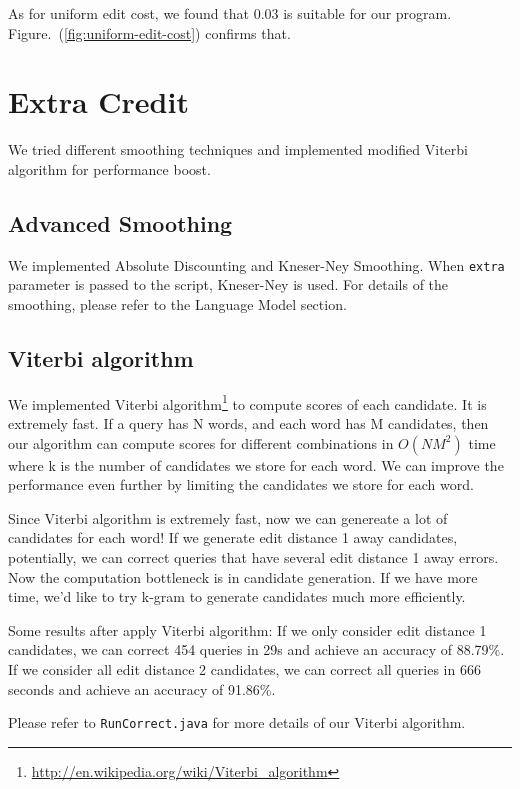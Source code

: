 \documentclass{article}
\begin{document}
As for uniform edit cost, we found that 0.03 is suitable for our program. Figure.~(\ref{fig:uniform-edit-cost}) confirms that.

\section{Extra Credit}

We tried different smoothing techniques and implemented modified Viterbi algorithm for performance boost.

\subsection{Advanced Smoothing}

We implemented Absolute Discounting and Kneser-Ney Smoothing. When \texttt{extra} parameter is passed to the script, Kneser-Ney is used. For details of the smoothing, please refer to the Language Model section.

\subsection{Viterbi algorithm}

We implemented Viterbi algorithm\footnote{\url{http://en.wikipedia.org/wiki/Viterbi\_algorithm}} to compute scores of each candidate. It is extremely fast. If a query has N words, and each word has M candidates, then our algorithm can compute scores for different combinations in $O(NM^2)$ time where k is the number of candidates we store for each word. We can improve the performance even further by limiting the candidates we store for each word.

Since Viterbi algorithm is extremely fast, now we can genereate a lot of candidates for each word! If we generate edit distance 1 away candidates, potentially, we can correct queries that have several edit distance 1 away errors. Now the computation bottleneck is in candidate generation. If we have more time, we'd like to try k-gram to generate candidates much more efficiently.

Some results after apply Viterbi algorithm: If we only consider edit distance 1 candidates, we can correct 454 queries in 29s and achieve an accuracy of 88.79\%. If we consider all edit distance 2 candidates, we can correct all queries in 666 seconds and achieve an accuracy of 91.86\%.

Please refer to \texttt{RunCorrect.java} for more details of our Viterbi algorithm.
\end{document}
